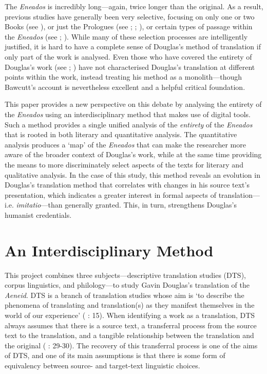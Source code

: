 \documentclass{dhbenelux}
\begin{document}
The \emph{Eneados} is incredibly long---again, twice longer than the
original. As a result, previous studies have generally been very
selective, focusing on only one or two Books (see 
\citeauthor{blyth1987} \citeyear{blyth1987}), or just the Prologues 
(see \citeauthor{ebin1980} \citeyear{ebin1980}; 
\citeauthor{archibald1980} \citeyear{archibald1980}; 
\citeauthor{nitecki1981} \citeyear{nitecki1981}), or certain types 
of passage within the \emph{Eneados} (see \citeauthor{ridley1983} 
\citeyear{ridley1983}; \citeauthor{macafee2013} 
\citeyear{macafee2013}). While many of these selection processes are 
intelligently justified, it is hard to have a complete sense of 
Douglas's method of translation if only part of the work is analysed. 
Even those who have covered the entirety of Douglas's work (see 
\citeauthor{watt1920} \citeyear{watt1920}; \citeauthor{bawcutt1976} 
\citeyear{bawcutt1976}) have not characterised Douglas's translation 
at different points within the work, instead treating his method as 
a monolith---though Bawcutt's account is nevertheless excellent and 
a helpful critical foundation.

This paper provides a new perspective on this debate by analysing the
entirety of the \emph{Eneados} using an interdisciplinary method that
makes use of digital tools. Such a method provides a single unified
analysis of the \emph{entirety} of the \emph{Eneados} that is rooted in
both literary and quantitative analysis. The quantitative analysis
produces a `map' of the \emph{Eneados} that can make the researcher more
aware of the broader context of Douglas's work, while at the same time
providing the means to more discriminately select aspects of the texts
for literary and qualitative analysis. In the case of this study, this
method reveals an evolution in Douglas's translation method that
correlates with changes in his source text's presentation, which
indicates a greater interest in formal aspects of translation---i.e.
\emph{imitatio}---than generally granted. This, in turn, strengthens
Douglas's humanist credentials.

\section{An Interdisciplinary Method}

This project combines three subjects---descriptive translation studies
(DTS), corpus linguistics, and philology---to study Gavin Douglas's
translation of the \emph{Aeneid}. DTS is a branch of translation studies
whose aim is `to describe the phenomena of translating and
translation(s) as they manifest themselves in the world of our
experience' (\citeauthor{holmes1987} \citeyear{holmes1987}: 15). When 
identifying a work as a translation, DTS always assumes that there is a 
source text, a transferral process from the source text to the translation, 
and a tangible relationship between the translation and the original 
(\citeauthor{toury2012} \citeyear{toury2012}: 29-30). The recovery of this 
transferral process is one of the aims of DTS, and one of its main 
assumptions is that there is some form of equivalency between source- and 
target-text linguistic choices.
\end{document}
